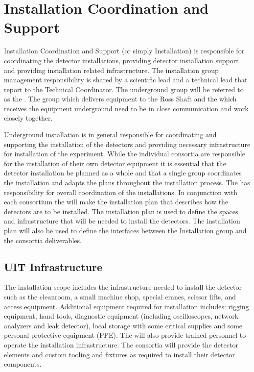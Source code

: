 \section{Installation Coordination and Support}
\label{sec:fdsp-coord-install}


Installation Coordination and Support (or simply Installation) is
responsible for coordinating the detector installations, providing
detector installation support and providing installation related
infrastructure. The installation group management responsibility is
shared by a scientific lead and a technical lead that report to the
Technical Coordinator. The underground group will be referred to as
the . The  group which delivers equipment to the
Ross Shaft and the  which receives the equipment
underground need to be in close communication and work closely
together.

Underground installation is in general responsible for coordinating
and supporting the installation of the detectors and providing
necessary infrastructure for installation of the experiment. While the
individual consortia are responsible for the installation of their own
detector equipment it is essential that the detector installation be
planned as a whole and that a single group coordinates the
installation and adapts the plans throughout the installation
process. The  has responsibility for overall coordination
of the installations. In conjunction with each consortium the
 will make the installation plan that describes how the
detectors are to be installed. The installation plan is used to define
the spaces and infrastructure that will be needed to install the
detectors. The installation plan will also be used to define the
interfaces between the Installation group and the consortia
deliverables.

\subsection{UIT Infrastructure}

The installation scope includes the infrastructure needed to install
the detector such as the cleanroom, a small machine shop, special
cranes, scissor lifts, and access equipment.  Additional equipment
required for installation includes: rigging equipment, hand tools,
diagnostic equipment (including oscilloscopes, network analyzers and
leak detector), local storage with some critical supplies and some
personal protective equipment (PPE). The  will also provide
trained personnel to operate the installation infrastructure. The
consortia will provide the detector elements and custom tooling and
fixtures as required to install their detector components.


